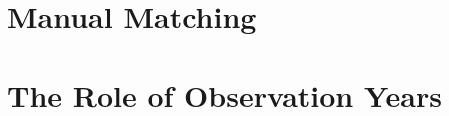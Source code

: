 \documentclass[12pt]{article}
\begin{document}
\begin{comment}
Prior to mechanically undertaking this step, it is useful to understand the role of primary issue markers.
The $LINKPRIM$ variable in the dataset can either denote primary or secondary markers.
In this field, \textit{'P'} is the primary marker; \textit{'J'} marks a secondary issue; \textit{'C'} is assigned by CRSP to resolve overlapping or missing primary markers, and \textit{'N'} is an overriding entry.
The \textit{N} marker distinguishes US and Canadian securities that Compustat would otherwise identify by the same GVKEY.


Centerpoint Energy is a case in point when matched on ticker symbol to Compustat via CRSP in this process.
With a sample period of interest between 1974 and 2002, matching based on the CCM Linkhist information yields one GVKEY-year observation for 2002 and a different GVKEY-year match for the period between 1980 and 2001.
This latter GVKEY changes between being a primary vs overlapping marker and first vs second firm-level security with no particular pattern.
Closer inspection of the data reveals that the GVKEY to PERMCO link that is only valid between Janury 1, 2002 and June 9, 2004 based on CCM Linkhist, is in fact the primary GVKEY since January 31, 1962.
This finding motivates the subsequent step to create a match with higher priority that employs the GVKEY validity period.
These matching steps for the example firm are available in the \texttt{Example\_CNP.sas} file.




In order to ensure that only one of the observations are kept, I assign a preference number to each type of marker for observations denoted \textit{'P'} taking the highest value of 4.
The observations are then sorted on CompanyID and TYEAR in ascending order and on this preference number (\textit{LPID}) in descending order.
Next, SAS is instructed to remove duplicates of CompanyID and TYEAR pairs.
Given the reverse sorting on LPID, observations with \textit{'P'} will be kept over observations with any of the other other markers.


\end{comment}

\section{Manual Matching}\label{sec:manual}

\section{The Role of Observation Years}\label{sec:years}
\end{document}
